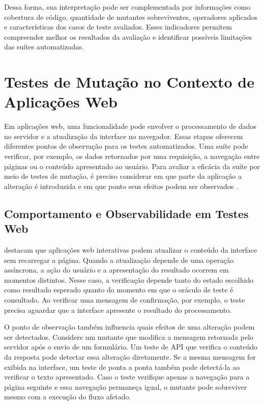 Dessa forma, sua interpretação pode ser complementada por informações como cobertura de código, quantidade de mutantes sobreviventes, operadores aplicados e características dos casos de teste avaliados. Esses indicadores permitem compreender melhor os resultados da avaliação e identificar possíveis limitações das suítes automatizadas.

\section{Testes de Mutação no Contexto de Aplicações Web}

Em aplicações web, uma funcionalidade pode envolver o processamento de dados no servidor e a atualização da interface no navegador. Essas etapas oferecem diferentes pontos de observação para os testes automatizados. Uma suíte pode verificar, por exemplo, os dados retornados por uma requisição, a navegação entre páginas ou o conteúdo apresentado ao usuário. Para avaliar a eficácia da suíte por meio de testes de mutação, é preciso considerar em que parte da aplicação a alteração é introduzida e em que ponto seus efeitos podem ser observados \cite{li2014webtesting}.

\subsection{Comportamento e Observabilidade em Testes Web}

 destacam que aplicações web interativas podem atualizar o conteúdo da interface sem recarregar a página. Quando a atualização depende de uma operação assíncrona, a ação do usuário e a apresentação do resultado ocorrem em momentos distintos. Nesse caso, a verificação depende tanto do estado escolhido como resultado esperado quanto do momento em que o oráculo de teste é consultado. Ao verificar uma mensagem de confirmação, por exemplo, o teste precisa aguardar que a interface apresente o resultado do processamento.

O ponto de observação também influencia quais efeitos de uma alteração podem ser detectados. Considere um mutante que modifica a mensagem retornada pelo servidor após o envio de um formulário. Um teste de API que verifica o conteúdo da resposta pode detectar essa alteração diretamente. Se a mesma mensagem for exibida na interface, um teste de ponta a ponta também pode detectá-la ao verificar o texto apresentado. Caso o teste verifique apenas a navegação para a página seguinte e essa navegação permaneça igual, o mutante pode sobreviver mesmo com a execução do fluxo afetado.

